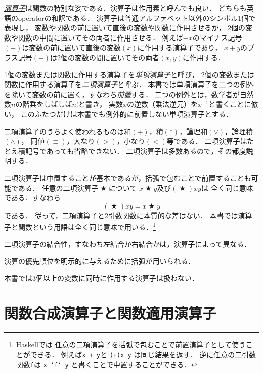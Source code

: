\documentclass[a5paper,draft]{jsbook}
\newcommand{\programminglanguage}[1]{\textsf{#1}}
\newcommand{\haskell}{\programminglanguage{Haskell}}
\newcommand{\keyword}[1]{{\underline{\emph{#1}}}}
\newcommand{\code}[1]{\texttt{#1}}
\newcommand{\mathBinaryOperator}[1]{\operatorname{#1}}
\newcommand{\mathAnyBinaryOperator}{\mathBinaryOperator{\bigstar}}
\begin{document}
\keyword{演算子}は関数の特別な姿である．演算子は作用素と呼んでも良い．
どちらも英語のoperatorの和訳である．
演算子は普通アルファベット以外のシンボル1個で表現し，
変数や関数の前に置いて直後の変数や関数に作用させるか，
2個の変数や関数の中間に置いてその両者に作用させる．
例えば$-x$のマイナス記号$(-)$は変数の前に置いて直後の変数$(x)$に作用する演算子であり，
$x+y$のプラス記号$(+)$は2個の変数の間に置いてその両者$\left(x,y\right)$に作用する．

1個の変数または関数に作用する演算子を\keyword{単項演算子}と呼び，
2個の変数または関数に作用する演算子を\keyword{二項演算子}と呼ぶ．
本書では単項演算子を二つの例外を除いて変数の前に置く，すなわち\keyword{前置}する．
二つの例外とは，数学者が自然数$n$の階乗をしばしば$n!$と書き，
実数$x$の逆数（乗法逆元）を$x^{-1}$と書くことに倣い，
このふたつだけは本書でも例外的に前置しない単項演算子とする．

二項演算子のうちよく使われるものは和$(+)$，積$(*)$，論理和$(\vee)$，論理積$(\wedge)$，
同値$(\equiv)$，大なり$(>)$，小なり$(<)$等である．
二項演算子はたとえ積記号であっても省略できない．
二項演算子は多数あるので，その都度説明する．

二項演算子は中置することが基本であるが，括弧で包むことで前置することも可能である．
任意の二項演算子$\mathAnyBinaryOperator$について
$x\mathAnyBinaryOperator y$及び$\left(\mathAnyBinaryOperator\right)xy$は
全く同じ意味である．すなわち
\begin{equation}
\left(\mathAnyBinaryOperator\right)xy=x\mathAnyBinaryOperator y
\end{equation}
である．
従って，二項演算子と2引数関数に本質的な差はない．
本書では演算子と関数という用語は全く同じ意味で用いる．\footnote{\haskell では
任意の二項演算子を括弧で包むことで前置演算子として使うことができる．
例えば\code{x + y}と \code{(+)x y} は同じ結果を返す．
逆に任意の二引数関数\code{f}は \code{x `f` y} と書くことで中置することができる．}

二項演算子の結合性，すなわち左結合か右結合かは，演算子によって異なる．

演算の優先順位を明示的に与えるために括弧が用いられる．

本書では3個以上の変数に同時に作用する演算子は扱わない．

\section{関数合成演算子と関数適用演算子}
\end{document}
